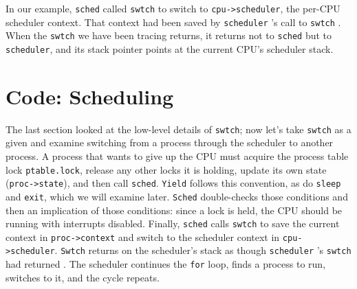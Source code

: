 In our example, 
\lstinline{sched}
called
\lstinline{swtch}
to switch to
\lstinline{cpu->scheduler},
the per-CPU scheduler context.
That context had been saved by 
\lstinline{scheduler} 's
call to
\lstinline{swtch}
.
When the
\lstinline{swtch}
we have been tracing returns,
it returns not to
\lstinline{sched}
but to 
\lstinline{scheduler},
and its stack pointer points at the current CPU's
scheduler stack.
\section{Code: Scheduling}

The last section looked at the low-level details of
\lstinline{swtch};
now let's take 
\lstinline{swtch}
as a given and examine 
switching from a process through the scheduler to another process.
A process
that wants to give up the CPU must
acquire the process table lock
\lstinline{ptable.lock},
release any other locks it is holding,
update its own state
(\lstinline{proc->state}),
and then call
\lstinline{sched}.
\lstinline{Yield}
follows this convention, as do
\lstinline{sleep}
and
\lstinline{exit},
which we will examine later.
\lstinline{Sched}
double-checks those conditions
and then an implication of those conditions:
since a lock is held, the CPU should be
running with interrupts disabled.
Finally,
\lstinline{sched}
calls
\lstinline{swtch}
to save the current context in 
\lstinline{proc->context}
and switch to the scheduler context in
\lstinline{cpu->scheduler}.
\lstinline{Swtch}
returns on the scheduler's stack
as though
\lstinline{scheduler} 's
\lstinline{swtch}
had returned
.
The scheduler continues the 
\lstinline{for}
loop, finds a process to run, 
switches to it, and the cycle repeats.

